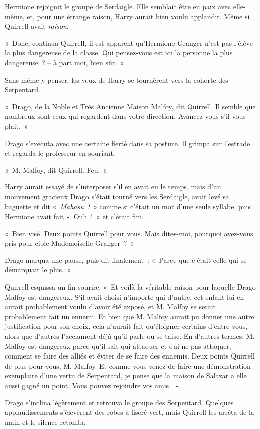 Hermione rejoignit le groupe de Serdaigle.
Elle semblait être en paix avec elle-même, et, pour une étrange raison, Harry aurait bien voulu applaudir.
Même si Quirrell avait \emph{raison}.

«~Donc, continua Quirrell, il est apparent qu'Hermione Granger n'est pas l'élève la plus dangereuse de la classe.
Qui pensez-vous est ici la personne la plus dangereuse~? -- à part moi, bien sûr.~»

Sans même y penser, les yeux de Harry se tournèrent vers la cohorte des Serpentard.

«~Drago, de la Noble et Très Ancienne Maison Malfoy, dit Quirrell.
Il semble que nombreux sont ceux qui regardent dans votre direction.
Avancez-vous s'il vous plait.~»

Drago s'exécuta avec une certaine fierté dans sa posture.
Il grimpa sur l'estrade et regarda le professeur en souriant.

«~M. Malfoy, dit Quirrell. Feu.~»

Harry aurait essayé de s'interposer s'il en avait eu le temps, mais d'un mouvement gracieux Drago s'était tourné vers les Serdaigle, avait levé sa baguette et dit «~\emph{Mahasu~!}~» comme si c'était un mot d'une seule syllabe, puis Hermione avait fait «~Ouh~!~» et c'était fini.

«~Bien visé. Deux points Quirrell pour vous.
Mais dites-moi, pourquoi avez-vous pris pour cible Mademoiselle Granger~?~»

Drago marqua une pause, puis dit finalement~: «~Parce que c'était celle qui se démarquait le plus.~»

Quirrell esquissa un fin sourire.
«~Et voilà la véritable raison pour laquelle Drago Malfoy est dangereux.
S'il avait choisi n'importe qui d'autre, cet enfant lui en aurait probablement voulu d'avoir été exposé, et M. Malfoy se serait probablement fait un ennemi.
Et bien que M. Malfoy aurait pu donner une autre justification pour son choix, cela n'aurait fait qu'éloigner certains d'entre vous, alors que d'autres l'acclament déjà qu'il parle ou se taise.
En d'autres termes, M. Malfoy est dangereux parce qu'il sait qui attaquer et qui ne pas attaquer, comment se faire des alliés et éviter de se faire des ennemis.
Deux points Quirrell de plus pour vous, M. Malfoy.
Et comme vous venez de faire une démonstration exemplaire d'une vertu de Serpentard, je pense que la maison de Salazar a elle aussi gagné un point.
Vous pouvez rejoindre vos amis.~»

Drago s'inclina légèrement et retrouva le groupe des Serpentard.
Quelques applaudissements s'élevèrent des robes à liseré vert, mais Quirrell les arrêta de la main et le silence retomba.


